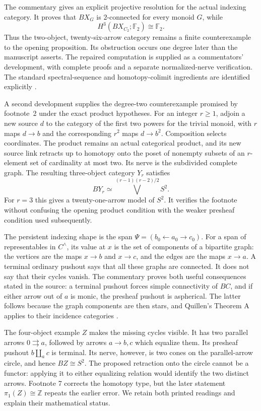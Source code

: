 The commentary gives an explicit projective resolution for the actual indexing category. It proves that \(BX_G\) is \(2\)-connected for every monoid \(G\), while
\[
 H^3(BX_{C_2};\mathbb F_2)\cong\mathbb F_2.
\]
Thus the two-object, twenty-six-arrow category remains a finite counterexample to the opening proposition. Its obstruction occurs one degree later than the manuscript asserts. The repaired computation is supplied as a commentators' development, with complete proofs and a separate normalized-nerve verification. The standard spectral-sequence and homotopy-colimit ingredients are identified explicitly \citep{Cegarra2020,Thomason1979}.

A second development supplies the degree-two counterexample promised by footnote~2 under the exact product hypotheses. For an integer \(r\geq1\), adjoin a new source \(d\) to the category of the first two powers for the trivial monoid, with \(r\) maps \(d\to b\) and the corresponding \(r^2\) maps \(d\to b^2\). Composition selects coordinates. The product remains an actual categorical product, and its new source link retracts up to homotopy onto the poset of nonempty subsets of an \(r\)-element set of cardinality at most two. Its nerve is the subdivided complete graph. The resulting three-object category \(Y_r\) satisfies
\[
 BY_r\simeq\bigvee^{(r-1)(r-2)/2}S^2.
\]
For \(r=3\) this gives a twenty-one-arrow model of \(S^2\). It verifies the footnote without confusing the opening product condition with the weaker presheaf condition used subsequently.

The persistent indexing shape is the span \(\Psi=(b_0\leftarrow a_0\to c_0)\). For a span of representables in \(C^\wedge\), its value at \(x\) is the set of components of a bipartite graph: the vertices are the maps \(x\to b\) and \(x\to c\), and the edges are the maps \(x\to a\). A terminal ordinary pushout says that all these graphs are connected. It does not say that their cycles vanish. The commentary proves both useful consequences stated in the source: a terminal pushout forces simple connectivity of \(BC\), and if either arrow out of \(a\) is monic, the presheaf pushout is aspherical. The latter follows because the graph components are then stars, and Quillen's Theorem A applies to their incidence categories \citep{Quillen1973}.

The four-object example \(Z\) makes the missing cycles visible. It has two parallel arrows \(0\rightrightarrows a\), followed by arrows \(a\to b,c\) which equalize them. Its presheaf pushout \(b\amalg_a c\) is terminal. Its nerve, however, is two cones on the parallel-arrow circle, and hence \(BZ\cong S^2\). The proposed retraction onto the circle cannot be a functor: applying it to either equalizing relation would identify the two distinct arrows. Footnote 7 corrects the homotopy type, but the later statement \(\pi_1(Z)\cong\mathbb Z\) repeats the earlier error. We retain both printed readings and explain their mathematical status.

